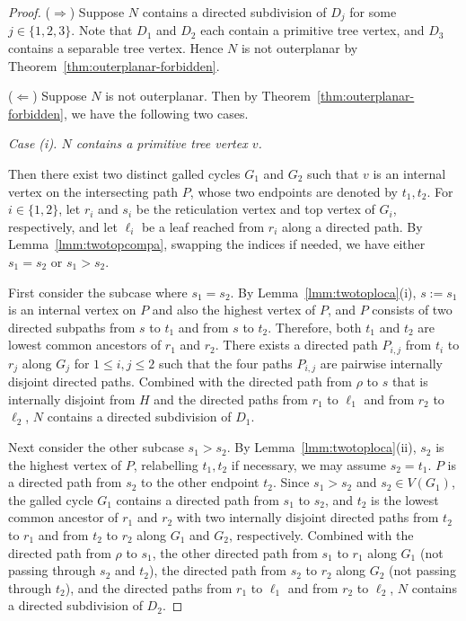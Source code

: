\documentclass[pdflatex,sn-mathphys-num]{sn-jnl}
\theoremstyle{thmstyleone}%
\theoremstyle{thmstyletwo}%
\theoremstyle{thmstylethree}%
\begin{document}
\begin{proof}

($\Rightarrow$) Suppose $N$ contains a directed subdivision of $D_j$ for some $j \in \{1,2,3\}$. Note that $D_1$ and $D_2$ each contain a primitive tree vertex, and $D_3$ contains a separable tree vertex. Hence $N$ is not outerplanar by Theorem~\ref{thm:outerplanar-forbidden}.

\smallskip

($\Leftarrow$) Suppose $N$ is not outerplanar. Then by Theorem~\ref{thm:outerplanar-forbidden}, we have the following two cases.


\smallskip

\noindent\textit{Case (i). $N$ contains a primitive tree vertex $v$.} 

Then there exist two distinct galled cycles $G_1$ and $G_2$ such that $v$ is an internal vertex on the intersecting path $P$, whose two endpoints are denoted by $t_1, t_2$.  For $i \in \{1, 2\}$, let $r_i$ and $s_i$ be the reticulation vertex and top vertex of $G_i$, respectively, and let $\ell_i$ be a leaf reached from $r_i$ along a directed path. By Lemma~\ref{lmm:twotopcompa}, swapping the indices  if needed, we have either $s_1 = s_2$ or $s_1 > s_2$.

First consider the subcase where $s_1=s_2$. By Lemma~\ref{lmm:twotoploca}(i), $s:=s_1$ is an internal vertex on $P$ and also the highest vertex of $P$, and $P$ consists of two directed subpaths from $s$ to $t_1$ and from $s$ to $t_2$.
Therefore, both $t_1$ and $t_2$ are lowest common ancestors of $r_1$ and $r_2$. There exists a directed path $P_{i,j}$ from $t_i$ to $r_j$ along $G_j$ for $1\le i,j\le 2$ such that the four paths $P_{i,j}$ are pairwise internally disjoint directed paths. Combined with the directed path from $\rho$ to $s$ that is internally disjoint from $H$ and the directed paths from $r_1$ to $\ell_1$ and from $r_2$ to $\ell_2$, $N$ contains a directed subdivision of $D_1$.


Next consider the other subcase $s_1 > s_2$.
By Lemma~\ref{lmm:twotoploca}(ii), $s_2$ is the highest vertex of $P$, relabelling $t_1,t_2$ if necessary, we may assume $s_2 = t_1$. $P$ is a directed path from $s_2$ to the other endpoint $t_2$.
Since $s_1 > s_2$ and $s_2 \in V(G_1)$, the galled cycle $G_1$ contains a directed path from $s_1$ to $s_2$, and $t_2$ is the lowest common ancestor of $r_1$ and $r_2$ with two internally disjoint directed paths from $t_2$ to $r_1$ and from $t_2$ to $r_2$ along $G_1$ and $G_2$, respectively.
Combined with the directed path from $\rho$ to $s_1$, the other directed path from $s_1$ to $r_1$ along $G_1$ (not passing through $s_2$ and $t_2$), the directed path from $s_2$ to $r_2$ along $G_2$ (not passing through $t_2$), and the directed paths from $r_1$ to $\ell_1$ and from $r_2$ to $\ell_2$, $N$ contains a directed subdivision of $D_2$.





\end{proof}
\end{document}
